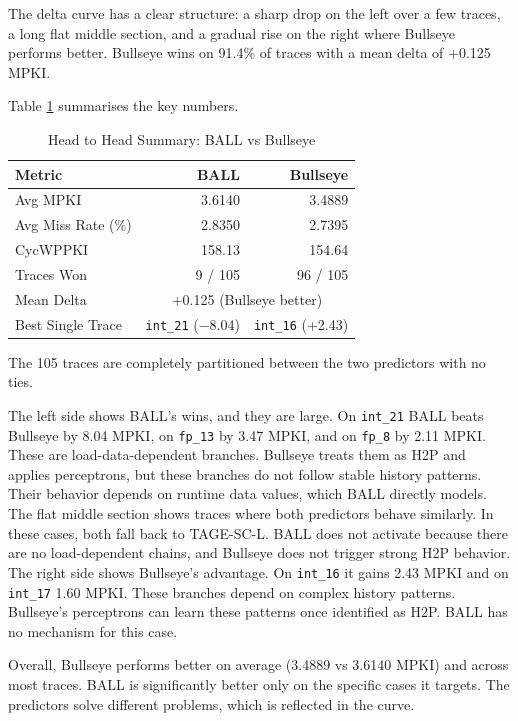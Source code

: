 \documentclass[11pt,a4paper]{article}
\begin{document}
The delta curve has a clear structure: a sharp drop on the left over a few traces, a long flat middle section, and a gradual rise on the right where Bullseye performs better. Bullseye wins on 91.4\% of traces with a mean delta of +0.125 MPKI.

Table \ref{tab:ball_vs_bullseye} summarises the key numbers.

\begin{table}[H]
\centering
\caption{Head to Head Summary: BALL vs Bullseye}
\label{tab:ball_vs_bullseye}
\begin{tabular}{lrr}
\toprule
\textbf{Metric} & \textbf{BALL} & \textbf{Bullseye} \\
\midrule
Avg MPKI            & 3.6140 & 3.4889 \\
Avg Miss Rate (\%)  & 2.8350 & 2.7395 \\
CycWPPKI            & 158.13 & 154.64 \\
Traces Won          & 9 / 105 & 96 / 105 \\
Mean Delta          & \multicolumn{2}{c}{+0.125 (Bullseye better)} \\
Best Single Trace   & \texttt{int\_21} ($-$8.04) & \texttt{int\_16} (+2.43) \\
\bottomrule
\end{tabular}
\end{table}

The 105 traces are completely partitioned between the two predictors with no ties.

The left side shows BALL’s wins, and they are large. On \texttt{int\_21} BALL beats Bullseye by 8.04 MPKI, on \texttt{fp\_13} by 3.47 MPKI, and on \texttt{fp\_8} by 2.11 MPKI. These are load-data-dependent branches. Bullseye treats them as H2P and applies perceptrons, but these branches do not follow stable history patterns. Their behavior depends on runtime data values, which BALL directly models.
The flat middle section shows traces where both predictors behave similarly. In these cases, both fall back to TAGE-SC-L. BALL does not activate because there are no load-dependent chains, and Bullseye does not trigger strong H2P behavior.
The right side shows Bullseye’s advantage. On \texttt{int\_16} it gains 2.43 MPKI and on \texttt{int\_17} 1.60 MPKI. These branches depend on complex history patterns. Bullseye’s perceptrons can learn these patterns once identified as H2P. BALL has no mechanism for this case.

Overall, Bullseye performs better on average (3.4889 vs 3.6140 MPKI) and across most traces. BALL is significantly better only on the specific cases it targets. The predictors solve different problems, which is reflected in the curve.
\end{document}

